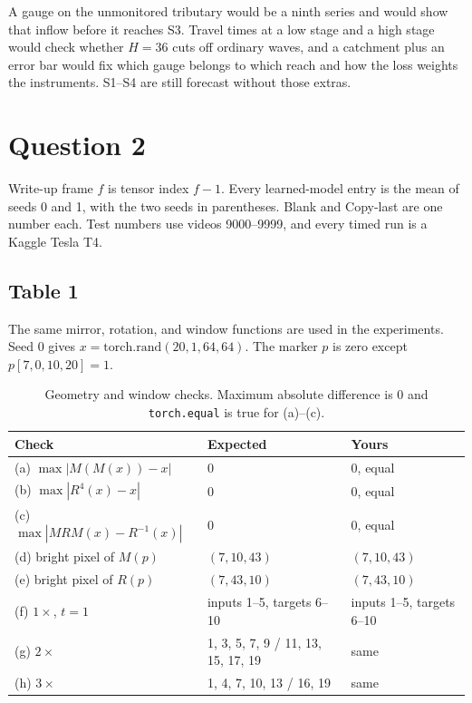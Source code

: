 \documentclass[11pt,a4paper]{article}
\begin{document}
A gauge on the unmonitored tributary would be a ninth series and would show that inflow before it reaches S3. Travel times at a low stage and a high stage would check whether \(H=36\) cuts off ordinary waves, and a catchment plus an error bar would fix which gauge belongs to which reach and how the loss weights the instruments. S1--S4 are still forecast without those extras.

\section{Question 2}

Write-up frame \(f\) is tensor index \(f-1\). Every learned-model entry is the mean of seeds 0 and 1, with the two seeds in parentheses. Blank and Copy-last are one number each. Test numbers use videos 9000--9999, and every timed run is a Kaggle Tesla T4.

\subsection{Table 1}

The same mirror, rotation, and window functions are used in the experiments. Seed 0 gives \(x=\mathrm{torch.rand}(20,1,64,64)\). The marker \(p\) is zero except \(p[7,0,10,20]=1\).

\begin{table}[H]
\centering
\caption{Geometry and window checks. Maximum absolute difference is 0 and \texttt{torch.equal} is true for (a)--(c).}
\small
\begin{tabular}{lll}
\toprule
Check & Expected & Yours \\
\midrule
(a) \(\max|M(M(x))-x|\) & 0 & 0, equal \\
(b) \(\max|R^{4}(x)-x|\) & 0 & 0, equal \\
(c) \(\max|MRM(x)-R^{-1}(x)|\) & 0 & 0, equal \\
(d) bright pixel of \(M(p)\) & \((7,10,43)\) & \((7,10,43)\) \\
(e) bright pixel of \(R(p)\) & \((7,43,10)\) & \((7,43,10)\) \\
(f) \(1\times\), \(t=1\) & inputs 1--5, targets 6--10 & inputs 1--5, targets 6--10 \\
(g) \(2\times\) & 1, 3, 5, 7, 9 / 11, 13, 15, 17, 19 & same \\
(h) \(3\times\) & 1, 4, 7, 10, 13 / 16, 19 & same \\
\bottomrule
\end{tabular}
\end{table}
\end{document}
